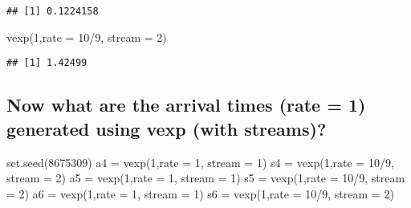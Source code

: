 \documentclass[
]{article}
\newenvironment{Shaded}{\begin{snugshade}}{\end{snugshade}}
\newcommand{\AttributeTok}[1]{\textcolor[rgb]{0.77,0.63,0.00}{#1}}
\newcommand{\DecValTok}[1]{\textcolor[rgb]{0.00,0.00,0.81}{#1}}
\newcommand{\FunctionTok}[1]{\textcolor[rgb]{0.00,0.00,0.00}{#1}}
\newcommand{\NormalTok}[1]{#1}
\newcommand{\OtherTok}[1]{\textcolor[rgb]{0.56,0.35,0.01}{#1}}
\newcommand{\SpecialCharTok}[1]{\textcolor[rgb]{0.00,0.00,0.00}{#1}}
\begin{document}
\begin{verbatim}
## [1] 0.1224158
\end{verbatim}

\begin{Shaded}
\begin{Highlighting}[]
\FunctionTok{vexp}\NormalTok{(}\DecValTok{1}\NormalTok{,}\AttributeTok{rate =} \DecValTok{10}\SpecialCharTok{/}\DecValTok{9}\NormalTok{, }\AttributeTok{stream =} \DecValTok{2}\NormalTok{)}
\end{Highlighting}
\end{Shaded}

\begin{verbatim}
## [1] 1.42499
\end{verbatim}

\hypertarget{now-what-are-the-arrival-times-rate-1-generated-using-vexp-with-streams}{%
\subsection{Now what are the arrival times (rate = 1) generated using
vexp (with
streams)?}\label{now-what-are-the-arrival-times-rate-1-generated-using-vexp-with-streams}}

\begin{Shaded}
\begin{Highlighting}[]
\FunctionTok{set.seed}\NormalTok{(}\DecValTok{8675309}\NormalTok{)}
\NormalTok{a4 }\OtherTok{=} \FunctionTok{vexp}\NormalTok{(}\DecValTok{1}\NormalTok{,}\AttributeTok{rate =} \DecValTok{1}\NormalTok{, }\AttributeTok{stream =} \DecValTok{1}\NormalTok{)}
\NormalTok{s4 }\OtherTok{=} \FunctionTok{vexp}\NormalTok{(}\DecValTok{1}\NormalTok{,}\AttributeTok{rate =} \DecValTok{10}\SpecialCharTok{/}\DecValTok{9}\NormalTok{, }\AttributeTok{stream =} \DecValTok{2}\NormalTok{)}
\NormalTok{a5 }\OtherTok{=} \FunctionTok{vexp}\NormalTok{(}\DecValTok{1}\NormalTok{,}\AttributeTok{rate =} \DecValTok{1}\NormalTok{, }\AttributeTok{stream =} \DecValTok{1}\NormalTok{)}
\NormalTok{s5 }\OtherTok{=} \FunctionTok{vexp}\NormalTok{(}\DecValTok{1}\NormalTok{,}\AttributeTok{rate =} \DecValTok{10}\SpecialCharTok{/}\DecValTok{9}\NormalTok{, }\AttributeTok{stream =} \DecValTok{2}\NormalTok{)}
\NormalTok{a6 }\OtherTok{=} \FunctionTok{vexp}\NormalTok{(}\DecValTok{1}\NormalTok{,}\AttributeTok{rate =} \DecValTok{1}\NormalTok{, }\AttributeTok{stream =} \DecValTok{1}\NormalTok{)}
\NormalTok{s6 }\OtherTok{=} \FunctionTok{vexp}\NormalTok{(}\DecValTok{1}\NormalTok{,}\AttributeTok{rate =} \DecValTok{10}\SpecialCharTok{/}\DecValTok{9}\NormalTok{, }\AttributeTok{stream =} \DecValTok{2}\NormalTok{)}
\end{Highlighting}
\end{Shaded}
\end{document}
